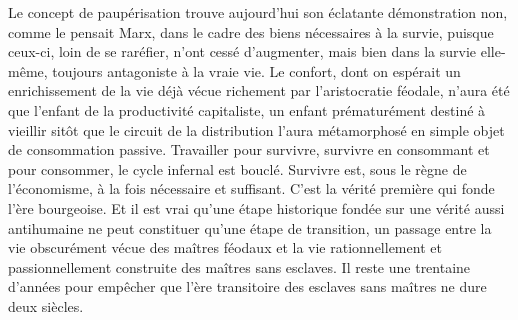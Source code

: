 \documentclass[french,twoside]{book} %
\begin{document}
Le concept de paupérisation trouve aujourd’hui son éclatante démonstration non, comme le pensait Marx, dans le cadre des biens nécessaires à la survie, puisque ceux-ci, loin de se raréfier, n’ont cessé d’augmenter, mais bien dans la survie elle-même, toujours antagoniste à la vraie vie. Le confort, dont on espérait un enrichissement de la vie déjà vécue richement par l’aristocratie féodale, n’aura été que l’enfant de la productivité capitaliste, un enfant prématurément destiné à vieillir sitôt que le circuit de la distribution l’aura métamorphosé en simple objet de consommation passive. Travailler pour survivre, survivre en consommant et pour consommer, le cycle infernal est bouclé. Survivre est, sous le règne de l’économisme, à la fois nécessaire et suffisant. C’est la vérité première qui fonde l’ère bourgeoise. Et il est vrai qu’une étape historique fondée sur une vérité aussi antihumaine ne peut constituer qu’une étape de transition, un passage entre la vie obscurément vécue des maîtres féodaux et la vie rationnellement et passionnellement construite des maîtres sans esclaves. Il reste une trentaine d’années pour empêcher que l’ère transitoire des esclaves sans maîtres ne dure deux siècles.
\end{document}
